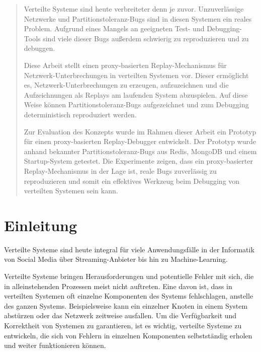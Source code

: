 \documentclass[12pt,a4paper]{report}
\begin{document}
\begin{abstract}
	Verteilte Systeme sind heute verbreiteter denn je zuvor.
	Unzuverlässige Netzwerke und Partitionstoleranz-Bugs sind in diesen Systemen ein reales Problem.
	Aufgrund eines Mangels an geeigneten Test- und Debugging-Tools sind viele dieser Bugs außerdem schwierig zu reproduzieren
	und zu debuggen.

	Diese Arbeit stellt einen proxy-basierten Replay-Mechanismus für Netzwerk-Unterbrechungen in verteilten Systemen vor.
	Dieser ermöglicht es, Netzwerk-Unterbrechungen zu erzeugen, aufzuzeichnen und die Aufzeichnungen als Replays am laufenden System
	abzuspielen. Auf diese Weise können Partitions\-toleranz-Bugs aufgezeichnet und zum Debugging deterministisch reproduziert werden.

	Zur Evaluation des Konzepts wurde im Rahmen dieser Arbeit ein Prototyp für einen proxy-basierten Replay-Debugger entwickelt.
	Der Prototyp wurde anhand bekannter Partitionstoleranz-Bugs aus Redis, MongoDB und einem Startup-System getestet.
	Die Experimente zeigen, dass ein proxy-basierter Replay-Mechanismus in der Lage ist, reale Bugs zuverlässig zu reproduzieren und somit
	ein effektives Werkzeug beim Debugging von verteilten Systemen sein kann.
\end{abstract}

\setlength{\parskip}{0em}
\tableofcontents
\thispagestyle{empty}
\setlength{\parskip}{0.6em}


\chapter{Einleitung}
\setcounter{page}{1}
Verteilte Systeme sind heute integral für viele Anwendungsfälle in der Informatik von Social Media über Streaming-Anbieter bis hin
zu Machine-Learning.

Verteilte Systeme bringen Herausforderungen und potentielle Fehler mit sich, die in alleinstehenden Prozessen meist nicht
auftreten. Eine davon ist, dass in verteilten Systemen oft einzelne Komponenten des Systems fehlschlagen, anstelle des ganzen
Systems. Beispielsweise kann ein einzelner Knoten in einem System abstürzen oder das Netzwerk zeitweise ausfallen. Um die
Verfüg\-bar\-keit und Korrektheit von Systemen zu garantieren, ist es wichtig, verteilte Systeme zu entwickeln, die sich von Fehlern
in einzelnen Komponenten selbst\-ständig erholen und weiter funktionieren können. \cite{distributed_systems_book}
\end{document}
